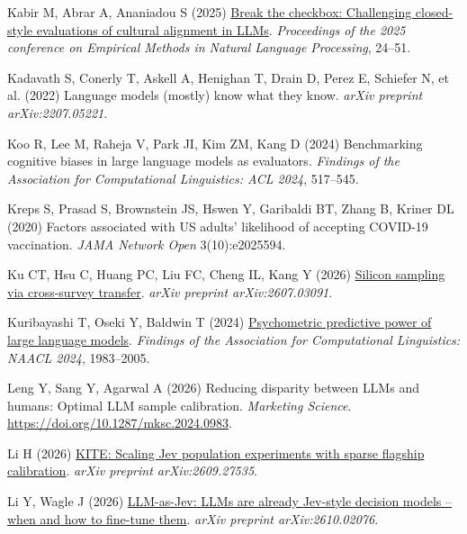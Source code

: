 \documentclass[
  11pt,
  letterpaper,
]{article}
\newlength{\cslhangindent}
\newenvironment{CSLReferences}[2] %
 {\begin{list}{}{%
  \setlength{\itemindent}{0pt}
  \setlength{\leftmargin}{0pt}
  \setlength{\parsep}{0pt}
  \ifodd #1
   \setlength{\leftmargin}{\cslhangindent}
   \setlength{\itemindent}{-1\cslhangindent}
  \fi
  \setlength{\itemsep}{#2\baselineskip}}}
 {\end{list}}
\begin{document}
\begin{CSLReferences}{1}{0}
Kabir M, Abrar A, Ananiadou S (2025)
\href{https://doi.org/10.18653/v1/2025.emnlp-main.2}{Break the checkbox:
Challenging closed-style evaluations of cultural alignment in {LLM}s}.
\emph{Proceedings of the 2025 conference on {Empirical Methods in
Natural Language Processing}}, 24--51.

{Kadavath S, Conerly T, Askell A, Henighan T, Drain D, Perez E, Schiefer
N, et al.} (2022) Language models (mostly) know what they know.
\emph{arXiv preprint arXiv:2207.05221}.

Koo R, Lee M, Raheja V, Park JI, Kim ZM, Kang D (2024) Benchmarking
cognitive biases in large language models as evaluators. \emph{Findings
of the {Association for Computational Linguistics}: {ACL} 2024},
517--545.

Kreps S, Prasad S, Brownstein JS, Hswen Y, Garibaldi BT, Zhang B, Kriner
DL (2020) Factors associated with {US} adults' likelihood of accepting
COVID-19 vaccination. \emph{JAMA Network Open} 3(10):e2025594.

Ku CT, Hsu C, Huang PC, Liu FC, Cheng IL, Kang Y (2026)
\href{https://arxiv.org/abs/2607.03091}{Silicon sampling via
cross-survey transfer}. \emph{arXiv preprint arXiv:2607.03091}.

Kuribayashi T, Oseki Y, Baldwin T (2024)
\href{https://doi.org/10.18653/v1/2024.findings-naacl.129}{Psychometric
predictive power of large language models}. \emph{Findings of the
{Association for Computational Linguistics}: {NAACL} 2024}, 1983--2005.

Leng Y, Sang Y, Agarwal A (2026) Reducing disparity between {LLM}s and
humans: Optimal {LLM} sample calibration. \emph{Marketing Science}.
\url{https://doi.org/10.1287/mksc.2024.0983}.

Li H (2026) \href{https://arxiv.org/abs/2609.27535}{{KITE}: Scaling
{Jev} population experiments with sparse flagship calibration}.
\emph{arXiv preprint arXiv:2609.27535}.

Li Y, Wagle J (2026)
\href{https://arxiv.org/abs/2610.02076}{{LLM-as-Jev}: {LLMs} are already
{Jev}-style decision models -- when and how to fine-tune them}.
\emph{arXiv preprint arXiv:2610.02076}.


\end{CSLReferences}
\end{document}
